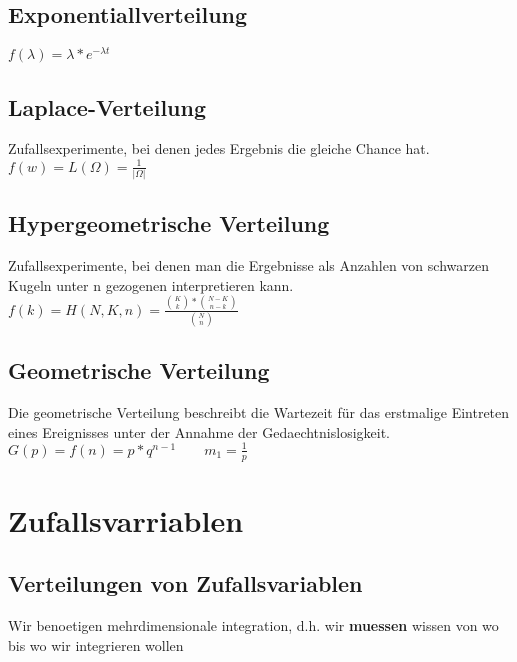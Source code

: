 \documentclass{article}
\begin{document}
\subsection{Exponentiallverteilung}
$f(\lambda) = \lambda*e^{-\lambda t}$

\subsection{Laplace-Verteilung}
Zufallsexperimente, bei denen jedes Ergebnis die gleiche Chance hat. \\
$f(w) = L(\Omega) = \frac{1}{|\Omega|}$
\subsection{Hypergeometrische Verteilung}
Zufallsexperimente, bei denen man die Ergebnisse als Anzahlen von schwarzen Kugeln unter 	n gezogenen interpretieren kann. \\
$f(k) = H(N, K, n) = \frac{\binom{K}{k}*\binom{N-K}{n-k}}{\binom{N}{n}}$
\subsection{Geometrische Verteilung}
Die geometrische Verteilung beschreibt die Wartezeit für das erstmalige Eintreten eines 	
Ereignisses unter der Annahme der Gedaechtnislosigkeit. \\
$G(p) = f(n) = p*q^{n-1} \quad \quad m_1 = \frac{1}{p}$
\section{Zufallsvarriablen}
\subsection{Verteilungen von Zufallsvariablen}
Wir benoetigen mehrdimensionale integration, d.h. wir \textbf{muessen} wissen von
wo bis wo wir integrieren wollen \\ \\
\end{document}

